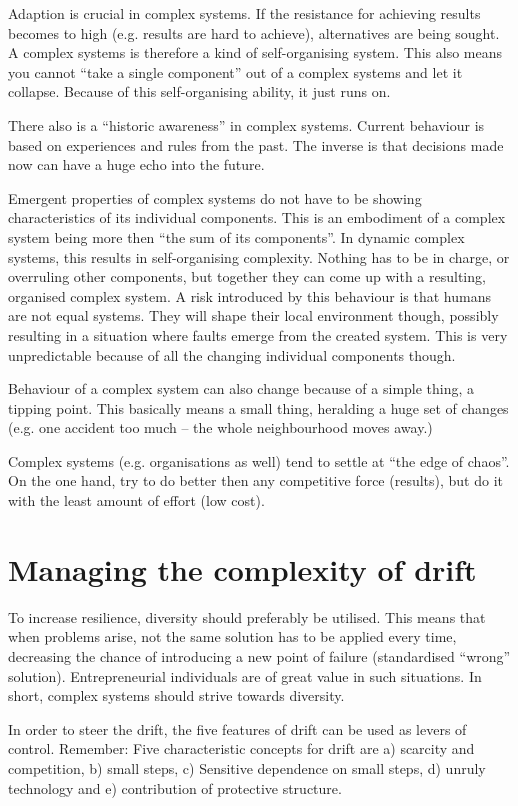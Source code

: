 Adaption is crucial in complex systems. 
If the resistance for achieving results becomes to high (e.g. results are hard to achieve), alternatives are being sought. 
A complex systems is therefore a kind of self-organising system.
This also means you cannot ``take a single component'' out of a complex systems and let it collapse. 
Because of this self-organising ability, it just runs on.

There also is a ``historic awareness'' in complex systems. 
Current behaviour is based on experiences and rules from the past. 
The inverse is that decisions made now can have a huge echo into the future.

Emergent properties of complex systems do not have to be showing characteristics of its individual components.
This is an embodiment of a complex system being more then ``the sum of its components''.
In dynamic complex systems, this results in self-organising complexity. 
Nothing has to be in charge, or overruling other components, but together they can come up with a resulting, organised complex system.
A risk introduced by this behaviour is that humans are not equal systems. 
They will shape their local environment though, possibly resulting in a situation where faults emerge from the created system. 
This is very unpredictable because of all the changing individual components though.

Behaviour of a complex system can also change because of a simple thing, a tipping point.
This basically means a small thing, heralding a huge set of changes (e.g. one accident too much -- the whole neighbourhood moves away.)

Complex systems (e.g. organisations as well) tend to settle at ``the edge of chaos''. 
On the one hand, try to do better then any competitive force (results), but do it with the least amount of effort (low cost). 

\section{Managing the complexity of drift}
To increase resilience, diversity should preferably be utilised.
This means that when problems arise, not the same solution has to be applied every time, decreasing the chance of introducing a new point of failure (standardised ``wrong'' solution).
Entrepreneurial individuals are of great value in such situations.
In short, complex systems should strive towards diversity.

In order to steer the drift, the five features of drift can be used as levers of control.
Remember: Five characteristic concepts for drift are a) scarcity and competition, b) small steps, c) Sensitive dependence on small steps, d) unruly technology and e) contribution of protective structure.

